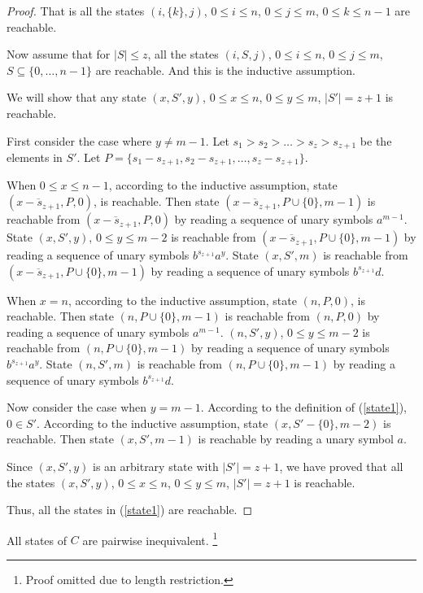\documentclass[copyright]{eptcs}
\begin{document}
\begin{proof}
That is all the states $(i, \{k\}, j)$, $0\leq i\leq n$, $0\leq
j\leq m$, $0\leq k\leq n-1$ are reachable.

Now assume that for $|S|\leq z$, all the states $(i, S, j)$,
$0\leq i\leq n$, $0\leq j\leq m$, $S\subseteq \{0,\ldots,n-1\}$
are reachable. And this is the inductive assumption.

We will show that any state $(x, S', y)$, $0\leq x\leq n$, $0\leq
y\leq m$, $|S'|=z+1$ is reachable.

First consider the case where $y\neq m-1$. Let $s_1 > s_2 > \ldots
> s_z > s_{z+1}$ be the elements in $S'$. Let $P= \{s_1-s_{z+1} ,
s_2-s_{z+1} , \ldots , s_z-s_{z+1}\}$.

When $0\leq x\leq n-1$, according to the inductive assumption,
state $(\overline{x-s_{z+1}}, P , 0)$, is reachable. Then state
$(\overline{x-s_{z+1}}, P\cup \{0\}, m-1)$ is reachable from
$(\overline{x-s_{z+1}}, P, 0)$ by reading a sequence of unary
symbols $a^{m-1}$. State $(x, S', y)$, $0\leq y\leq m-2$ is
reachable from $(\overline{x-s_{z+1}}, P\cup \{0\}, m-1)$ by
reading a sequence of unary symbols $b^{s_{z+1}}a^{y}$. State $(x,
S', m)$ is reachable from $(\overline{x-s_{z+1}}, P\cup \{0\},
m-1)$ by reading a sequence of unary symbols $b^{s_{z+1}}d$.

When $x=n$, according to the inductive assumption, state $(n, P ,
0)$, is reachable. Then state $(n, P\cup \{0\}, m-1)$ is reachable
from $(n, P, 0)$ by reading a sequence of unary symbols $a^{m-1}$.
$(n, S', y)$, $0\leq y\leq m-2$ is reachable from $(n, P\cup
\{0\}, m-1)$ by reading a sequence of unary symbols
$b^{s_{z+1}}a^{y}$. State $(n, S', m)$ is reachable from $(n,
P\cup \{0\}, m-1)$ by reading a sequence of unary symbols
$b^{s_{z+1}}d$.

Now consider the case when $y=m-1$. According to the definition of
(\ref{state1}), $0\in S'$. According to the inductive assumption,
state $(x, S'-\{0\}, m-2)$ is reachable. Then state $(x, S', m-1)$
is reachable by reading a unary symbol $a$.

Since $(x, S', y)$ is an arbitrary state with $|S'|=z+1$, we have
proved that all the states $(x, S', y)$, $0\leq x\leq n$, $0\leq
y\leq m$, $|S'|=z+1$ is reachable.

Thus, all the states in (\ref{state1}) are reachable.
\end{proof}\endpf

\begin{lemma}
All states of $C$ are pairwise inequivalent. \footnote{Proof
omitted due to length restriction.} \label{inequi}
\end{lemma}
\end{document}
